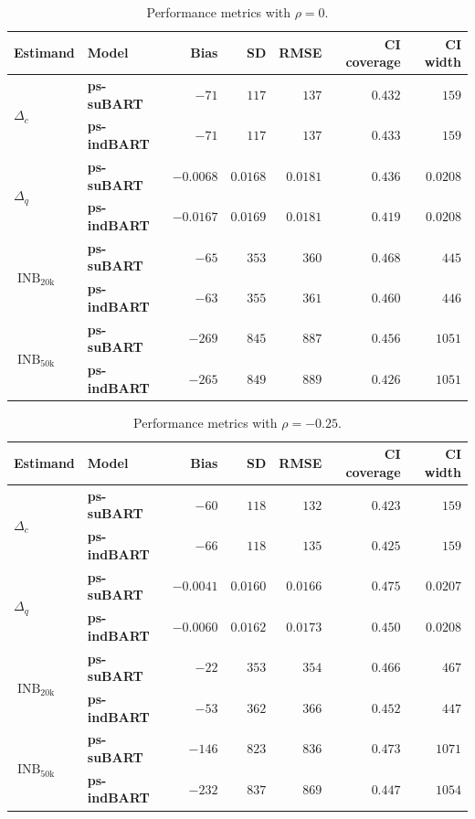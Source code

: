 \documentclass[aoas,preprint]{imsart}
\theoremstyle{plain}
\theoremstyle{definition}
\theoremstyle{remark}
\begin{document}
\begin{appendix}
\begin{table}[H]
\caption{Performance metrics with $\rho = 0$.\label{tab:indbart0}}
\setlength{\tabcolsep}{3.75pt}
\begin{tabular}{ll|rrrrr}
\textbf{Estimand} & \textbf{Model} & Bias & SD & RMSE & CI coverage & CI width \\
\hline
\multirow{2}{*}{$\Delta_c$} & \textbf{ps-suBART} & $-71$& $117$& $137$& $0.432$& $159$ \\
&\textbf{ps-indBART}& $-71$& $117$& $137$& $0.433$& $159$ \\
\multirow{2}{*}{$\Delta_q$} & \textbf{ps-suBART} & $-0.0068$& $0.0168$& $0.0181$& $0.436$& $0.0208$ \\
& \textbf{ps-indBART} & $-0.0167$& $0.0169$& $0.0181$& $0.419$& $0.0208$\\
\multirow{2}{*}{$\operatorname{INB}_{\mathrm{20k}}$} & \textbf{ps-suBART} & $-65$& $353$& $360$& $0.468$& $445$ \\
& \textbf{ps-indBART} & $-63$& $355$& $361$& $0.460$& $446$ \\
\multirow{2}{*}{$\operatorname{INB}_{\mathrm{50k}}$} & \textbf{ps-suBART} & $-269$ & $845$& $887$& $0.456$& $1051$ \\
& \textbf{ps-indBART} & $-265$& $849$& $889$& $0.426$& $1051$
\end{tabular}
\end{table}

\begin{table}[H]
\caption{Performance metrics with $\rho = -0.25$.\label{tab:indbart025}}
\setlength{\tabcolsep}{3.75pt}
\begin{tabular}{ll|rrrrr}
\textbf{Estimand} & \textbf{Model} & Bias & SD & RMSE & CI coverage & CI width \\
\hline
\multirow{2}{*}{$\Delta_c$} & \textbf{ps-suBART} & $-60$& $118$& $132$& $0.423$& $159$ \\
&\textbf{ps-indBART} & $-66$& $118$& $135$& $0.425$& $159$ \\
\multirow{2}{*}{$\Delta_q$} & \textbf{ps-suBART} & $-0.0041$& $0.0160$& $0.0166$& $0.475$& $0.0207$ \\
& \textbf{ps-indBART} &$-0.0060$& $0.0162$& $0.0173$& $0.450$& $0.0208$\\
\multirow{2}{*}{$\operatorname{INB}_{\mathrm{20k}}$} & \textbf{ps-suBART} &$-22$& $353$& $354$& $0.466$& $467$ \\
& \textbf{ps-indBART} & $-53$& $362$& $366$& $0.452$& $447$ \\
\multirow{2}{*}{$\operatorname{INB}_{\mathrm{50k}}$} & \textbf{ps-suBART} & $-146$ & $823$& $836$& $0.473$& $1071$ \\
& \textbf{ps-indBART} &$-232$& $837$& $869$& $0.447$& $1054$
\end{tabular}
\end{table}


\end{appendix}
\end{document}
